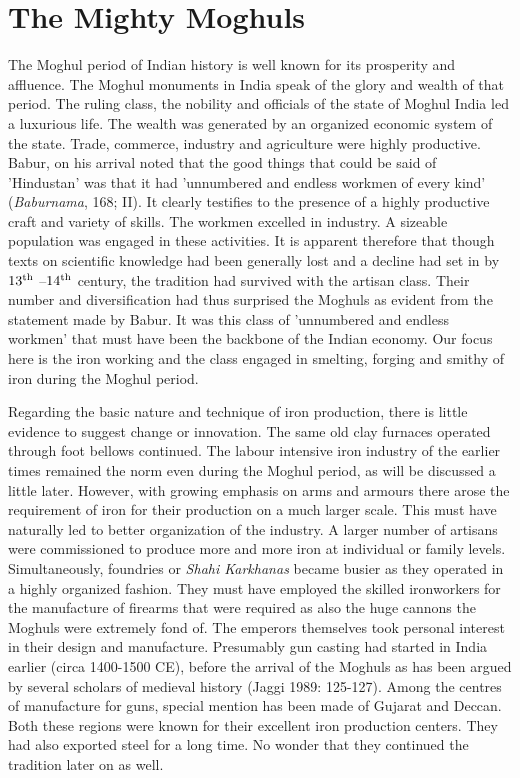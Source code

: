 \section*{The Mighty Moghuls}\label{section-2}

The Moghul period of Indian history is well known for its prosperity and affluence. The Moghul monuments in India speak of the glory and wealth of that period. The ruling class, the nobility and officials of the state of Moghul India led a luxurious life. The wealth was generated by an organized economic system of the state. Trade, commerce, industry and agriculture were highly productive. Babur, on his arrival noted that the good things that could be said of 'Hindustan' was that it had 'unnumbered and endless workmen of every kind' ({\it Baburnama}, 168; II). It clearly testifies to the presence of a highly productive craft and variety of skills. The workmen excelled in industry. A sizeable population was engaged in these activities. It is apparent therefore that though texts on scientific knowledge had been generally lost and a decline had set in by $13^{\rm th}$ –$14^{\rm th}$ century, the tradition had survived with the artisan class. Their number and diversification had thus surprised the Moghuls as evident from the statement made by Babur. It was this class of 'unnumbered and endless workmen' that must have been the backbone of the Indian economy. Our focus here is the iron working and the class engaged in smelting, forging and smithy of iron during the Moghul period.

Regarding the basic nature and technique of iron production, there is little evidence to suggest change or innovation. The same old clay furnaces operated through foot bellows continued. The labour intensive iron industry of the earlier times remained the norm even during the Moghul period, as will be discussed a little later. However, with growing emphasis on arms and armours there arose the requirement of iron for their production on a much larger scale. This must have naturally led to better organization of the industry. A larger number of artisans were commissioned to produce more and more iron at individual or family levels. Simultaneously, foundries or {\it Shahi Karkhanas} became busier as they operated in a highly organized fashion. They must have employed the skilled ironworkers for the manufacture of firearms that were required as also the huge cannons the Moghuls were extremely fond of. The emperors themselves took personal interest in their design and manufacture. Presumably gun casting had started in India earlier (circa 1400-1500 CE), before the arrival of the Moghuls as has been argued by several scholars of medieval history (Jaggi 1989: 125-127). Among the centres of manufacture for guns, special mention has been made of Gujarat and Deccan. Both these regions were known for their excellent iron production centers. They had also exported steel for a long time. No wonder that they continued the tradition later on as well.

